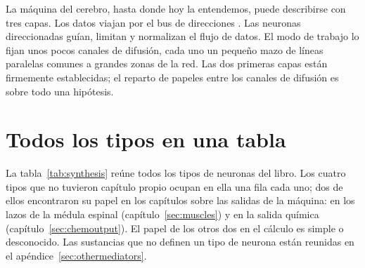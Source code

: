 \begin{keyblock}
\begin{proposition}[Arquitectura]
\label{prop:architecture}
La máquina del cerebro, hasta donde hoy la entendemos, puede describirse con tres capas. Los datos viajan por el bus de direcciones . Las neuronas  direccionadas guían, limitan y normalizan el flujo de datos. El modo de trabajo lo fijan unos pocos canales de difusión, cada uno un pequeño mazo de líneas paralelas comunes a grandes zonas de la red. Las dos primeras capas están firmemente establecidas; el reparto de papeles entre los canales de difusión es sobre todo una hipótesis.
\end{proposition}
\end{keyblock}

\section{Todos los tipos en una tabla}

La tabla~\ref{tab:synthesis} reúne todos los tipos de neuronas del libro. Los cuatro tipos que no tuvieron capítulo propio ocupan en ella una fila cada uno; dos de ellos encontraron su papel en los capítulos sobre las salidas de la máquina:  en los lazos de la médula espinal (capítulo~\ref{sec:muscles}) y  en la salida química (capítulo~\ref{sec:chemoutput}). El papel de los otros dos en el cálculo es simple o desconocido. Las sustancias que no definen un tipo de neurona están reunidas en el apéndice~\ref{sec:othermediators}.

